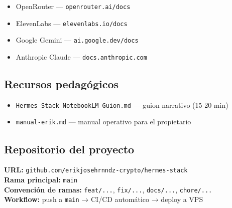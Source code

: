 \documentclass[11pt,a4paper]{article}
\newcommand{\dato}[2]{\textbf{\color{hermesblue}#1:} #2}
\begin{document}
\begin{itemize}[leftmargin=*,itemsep=1pt]
\item OpenRouter — \texttt{openrouter.ai/docs}
\item ElevenLabs — \texttt{elevenlabs.io/docs}
\item Google Gemini — \texttt{ai.google.dev/docs}
\item Anthropic Claude — \texttt{docs.anthropic.com}
\end{itemize}

\subsection{Recursos pedagógicos}

\begin{itemize}[leftmargin=*,itemsep=1pt]
\item \texttt{Hermes\_Stack\_NotebookLM\_Guion.md} — guion narrativo (15-20 min)
\item \texttt{manual-erik.md} — manual operativo para el propietario
\end{itemize}

\subsection{Repositorio del proyecto}

\dato{URL}{\texttt{github.com/erikjosehrnndz-crypto/hermes-stack}}\\
\dato{Rama principal}{\texttt{main}}\\
\dato{Convención de ramas}{\texttt{feat/...}, \texttt{fix/...}, \texttt{docs/...}, \texttt{chore/...}}\\
\dato{Workflow}{push a \texttt{main} → CI/CD automático → deploy a VPS}

\vspace{2cm}

\begin{center}
\end{center}
\end{document}
